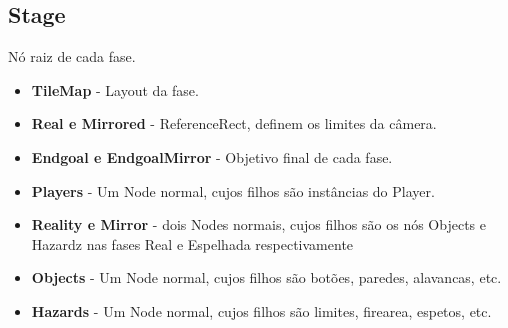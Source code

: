 \documentclass[a4paper, 11pt]{article}
\begin{document}
		\subsection{Stage}
			Nó raiz de cada fase.
			\begin{itemize}
				\item \textbf{TileMap} - Layout da fase.
				\item \textbf{Real e Mirrored} - ReferenceRect, definem os limites da câmera.
				\item \textbf{Endgoal e EndgoalMirror} - Objetivo final de cada fase.
				\item \textbf{Players} - Um Node normal, cujos filhos são instâncias do Player.
				\item \textbf{Reality e Mirror} - dois Nodes normais, cujos filhos são os nós Objects e Hazardz nas fases Real e Espelhada respectivamente
				\item \textbf{Objects} - Um Node normal, cujos filhos são botões, paredes, alavancas, etc.
				\item \textbf{Hazards} - Um Node normal, cujos filhos são limites, firearea, espetos, etc.
			\end{itemize}
\end{document}
